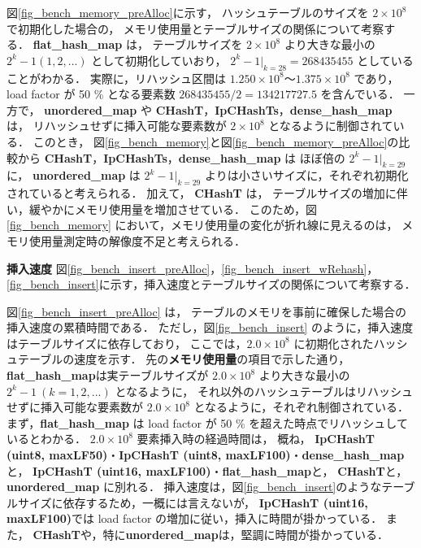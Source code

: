 図\ref{fig_bench_memory_preAlloc}に示す，
ハッシュテーブルのサイズを $2\times10^8$ で初期化した場合の，
メモリ使用量とテーブルサイズの関係について考察する．
{\bf flat\_hash\_map} は，
テーブルサイズを $2\times10^8$ より大きな最小の $2^k-1 (1,2,...)$ として初期化していおり，
$2^k-1|_{k=28} = 268435455$ としていることがわかる．
実際に，リハッシュ区間は $1.250\times10^8〜1.375\times10^8$ であり，
load factor が 50 \% となる要素数 $268435455/2=134217727.5$ を含んでいる．
一方で，
{\bf unordered\_map} や {\bf CHashT}，{\bf IpCHashTs}，{\bf dense\_hash\_map} は，
リハッシュせずに挿入可能な要素数が $2\times10^8$ となるように制御されている．
このとき，
図\ref{fig_bench_memory}と図\ref{fig_bench_memory_preAlloc}の比較から
{\bf CHashT}，{\bf IpCHashTs}，{\bf dense\_hash\_map} は
ほぼ倍の $2^k-1|_{k=29}$ に，
{\bf unordered\_map} は  $2^k-1|_{k=29}$ よりは小さいサイズに，それぞれ初期化されていると考えられる．
加えて，
{\bf CHashT} は，
テーブルサイズの増加に伴い，緩やかにメモリ使用量を増加させている．
このため，図\ref{fig_bench_memory} において，メモリ使用量の変化が折れ線に見えるのは，
メモリ使用量測定時の解像度不足と考えられる．
\leavevmode \newline

%
{\bf 挿入速度}
\samepage\newline\indent
図\ref{fig_bench_insert_preAlloc}，\ref{fig_bench_insert_wRehash}，\ref{fig_bench_insert}に示す，挿入速度とテーブルサイズの関係について考察する．

図\ref{fig_bench_insert_preAlloc} は，
テーブルのメモリを事前に確保した場合の挿入速度の累積時間である．
ただし，図\ref{fig_bench_insert} のように，挿入速度はテーブルサイズに依存しており，
ここでは，$2.0\times10^8$ に初期化されたハッシュテーブルの速度を示す．
先の{\bf メモリ使用量}の項目で示した通り，
{\bf flat\_hash\_map}は実テーブルサイズが $2.0\times10^8$ より大きな最小の $2^k-1\ (k=1,2,...)$ となるように，
それ以外のハッシュテーブルはリハッシュせずに挿入可能な要素数が $2.0\times10^8$ となるように，それぞれ制御されている．
まず，{\bf flat\_hash\_map} は load factor が 50 \% を超えた時点でリハッシュしているとわかる．
$2.0\times10^8$ 要素挿入時の経過時間は，
概ね，
{\bf IpCHashT (uint8, maxLF50)}・{\bf IpCHashT (uint8, maxLF100)}・{\bf dense\_hash\_map}と，
{\bf IpCHashT (uint16, maxLF100)}・{\bf flat\_hash\_map}と，
{\bf CHashT}と，
{\bf unordered\_map} に別れる．
挿入速度は，図\ref{fig_bench_insert}のようなテーブルサイズに依存するため，一概には言えないが，
{\bf IpCHashT (uint16, maxLF100)}では load factor の増加に従い，挿入に時間が掛かっている．
また，
{\bf CHashT}や，特に{\bf unordered\_map}は，堅調に時間が掛かっている．

